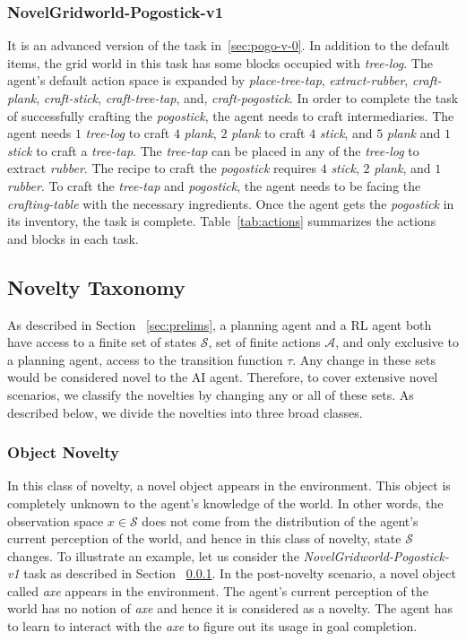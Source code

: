 \documentclass[sigconf]{aamas}
\begin{document}
\subsubsection{\textbf{NovelGridworld-Pogostick-v1}}
\label{sec:pogo-v-1}
It is an advanced version of the task in~\ref{sec:pogo-v-0}. In addition to the default items, the grid world in this task has some blocks occupied with \emph{tree-log}. The agent's default action space is expanded by \emph{place-tree-tap}, \emph{extract-rubber}, 
\emph{craft-plank}, \emph{craft-stick}, \emph{craft-tree-tap}, and, \emph{craft-pogostick}. In order to complete the task of successfully crafting the \emph{pogostick}, the agent needs to craft intermediaries. The agent needs $1$ \emph{tree-log} to craft $4$ \emph{plank}, $2$ \emph{plank} to craft $4$ \emph{stick}, and $5$ \emph{plank} and $1$ \emph{stick} to craft a \emph{tree-tap}. The \emph{tree-tap} can be placed in any of the \emph{tree-log} to extract \emph{rubber}. The recipe to craft the \emph{pogostick} requires $4$ \emph{stick}, $2$ \emph{plank}, and $1$ \emph{rubber}. To craft the \emph{tree-tap} and \emph{pogostick}, the agent needs to be facing the \emph{crafting-table} with the necessary ingredients. Once the agent gets the \emph{pogostick} in its inventory, the task is complete. Table~\ref{tab:actions} summarizes the actions and blocks in each task.


\subsection{Novelty Taxonomy}
As described in Section ~\ref{sec:prelims}, a planning agent and a RL agent both have access to a finite set of states $\mathcal{S}$, set of finite actions $\mathcal{A}$, and only exclusive to a planning agent, access to the transition function $\tau$. Any change in these sets would be considered novel to the AI agent. Therefore, to cover extensive novel scenarios, we classify the novelties by changing any or all of these sets. As described below, we divide the novelties into three broad classes.



\subsubsection{Object Novelty}
In this class of novelty, a novel object appears in the environment. This object is completely unknown to the agent's knowledge of the world. In other words, the observation space $x \in \mathcal{S}$ does not come from the distribution of the agent's current perception of the world, and hence in this class of novelty, state $\mathcal{S}$ changes.
To illustrate an example, let us consider the \emph{NovelGridworld-Pogostick-v1} task as described in Section ~\ref{sec:pogo-v-1}. In the post-novelty scenario, a novel object called \emph{axe} appears in the environment. The agent's current perception of the world has no notion of \emph{axe} and hence it is considered as a novelty. The agent has to learn to interact with the \emph{axe} to figure out its usage in goal completion.
\end{document}
